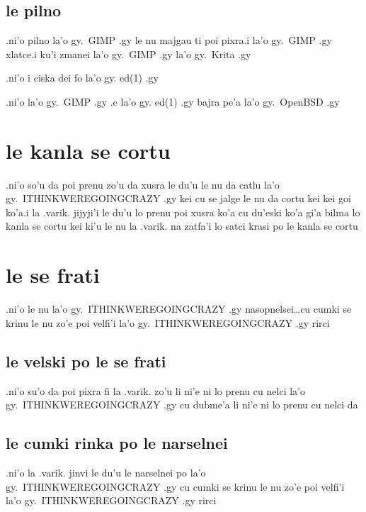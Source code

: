 \documentclass{report}
\begin{document}
\subsection{le pilno}
.ni'o pilno la'o gy.\ GIMP .gy le nu majgau ti poi pixra\@ .i  la'o gy.\ GIMP .gy xlatce\@ .i ku'i zmanei la'o gy.\ GIMP .gy la'o gy.\ Krita .gy

.ni'o i ciska dei fo la'o gy. ed(1) .gy

.ni'o la'o gy.\ GIMP .gy .e la'o gy. ed(1) .gy bajra pe'a la'o gy.\ OpenBSD .gy

\section{le kanla se cortu}
.ni'o so'u da poi prenu zo'u da xusra le du'u le nu da catlu la'o gy.\ ITHINKWEREGOINGCRAZY .gy kei cu se jalge le nu da cortu kei kei goi ko'a\@  .i la .varik. jijyji'i le du'u lo prenu poi xusra ko'a cu du'eski ko'a gi'a bilma lo kanla se cortu kei ki'u le nu la .varik. na zatfa'i lo satci krasi po le kanla se cortu

\section{le se frati}
.ni'o le nu la'o gy.\ ITHINKWEREGOINGCRAZY .gy nasopnelsei\ldots cu cumki se krinu le nu zo'e poi velfi'i la'o gy.\ ITHINKWEREGOINGCRAZY .gy rirci

\subsection{le velski po le se frati}
.ni'o su'o da poi pixra fi la .varik. zo'u li ni'e ni lo prenu cu nelci la'o gy.\ ITHINKWEREGOINGCRAZY .gy cu dubme'a li ni'e ni lo prenu cu nelci da

\subsection{le cumki rinka po le narselnei}
.ni'o la .varik. jinvi le du'u le narselnei po la'o gy.\ ITHINKWEREGOINGCRAZY .gy  cu cumki se krinu le nu zo'e poi velfi'i la'o gy.\ ITHINKWEREGOINGCRAZY .gy rirci
\end{document}
